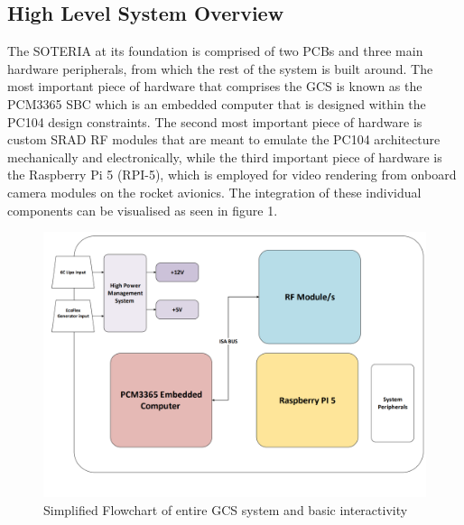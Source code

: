 \subsection{High Level System Overview}
The SOTERIA at its foundation is comprised of two PCBs and three main hardware peripherals, from which the rest of the system is built around. The most important piece of hardware that comprises the GCS is known as the PCM3365 SBC which is an embedded computer that is designed within the PC104 design constraints\cite{Advantech}. The second most important piece of hardware is custom SRAD RF modules that are meant to emulate the PC104 architecture mechanically and electronically, while the third important piece of hardware is the Raspberry Pi 5 (RPI-5), which is employed for video rendering from onboard camera modules on the rocket avionics. The integration of these individual components can be visualised as seen in figure 1.
\begin{figure}[h]
    \centering
    \includegraphics[scale = 0.7, ]{img/GCS simplified.PNG}
    \caption{Simplified Flowchart of entire GCS system and basic interactivity}
    \label{Figure 1: Simplified Flowchart of entire GCS system and basic interactivity}
\end{figure}
\clearpage
